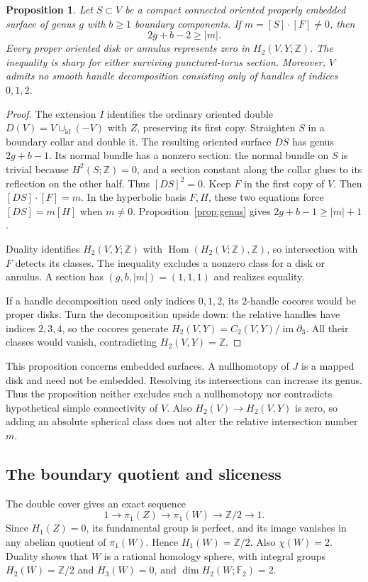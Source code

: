 \documentclass[11pt]{amsart}
\newtheorem{proposition}[theorem]{Proposition}
\theoremstyle{definition}
\theoremstyle{remark}
\newcommand{\Z}{\mathbb Z}
\newcommand{\Ftwo}{\mathbb F_2}
\begin{document}
\begin{proposition}\label{prop:relative-genus}
Let $S\subset V$ be a compact connected oriented properly embedded
surface of genus $g$ with $b\ge1$ boundary components. If
$m=[S]\cdot[F]\ne0$, then
\[
                         2g+b-2\ge |m|.
\]
Every proper oriented disk or annulus represents zero in
$H_2(V,Y;\Z)$. The inequality is sharp for either surviving
punctured-torus section. Moreover, $V$ admits no smooth handle
decomposition consisting only of handles of indices $0,1,2$.
\end{proposition}
\begin{proof}
The extension $I$ identifies the ordinary oriented double
$D(V)=V\cup_{\mathrm{id}}(-V)$ with $Z$, preserving its first copy.
Straighten $S$ in a boundary collar and double it. The resulting
oriented surface $DS$ has genus $2g+b-1$. Its normal bundle has a
nonzero section: the normal bundle on $S$ is trivial because
$H^2(S;\Z)=0$, and a section constant along the collar glues to its
reflection on the other half. Thus $[DS]^2=0$.
Keep $F$ in the first copy of $V$. Then $[DS]\cdot[F]=m$.
In the hyperbolic basis $F,H$, these two equations force
$[DS]=m[H]$ when $m\ne0$. Proposition~\ref{prop:genus} gives
$2g+b-1\ge |m|+1$.

Duality identifies $H_2(V,Y;\Z)$ with
$\operatorname{Hom}(H_2(V;\Z),\Z)$, so intersection with $F$
detects its classes. The inequality excludes a nonzero class for
a disk or annulus. A section has $(g,b,|m|)=(1,1,1)$ and realizes
equality.

If a handle decomposition used only indices $0,1,2$, its $2$-handle
cocores would be proper disks. Turn the decomposition upside down:
the relative handles have indices $2,3,4$, so the cocores generate
$H_2(V,Y)=C_2(V,Y)/\operatorname{im}\partial_3$. All their classes
would vanish, contradicting $H_2(V,Y)=\Z$.
\end{proof}

This proposition concerns embedded surfaces. A nullhomotopy of $J$
is a mapped disk and need not be embedded. Resolving its intersections
can increase its genus. Thus the proposition neither excludes such a
nullhomotopy nor contradicts hypothetical simple connectivity of $V$.
Also $H_2(V)\to H_2(V,Y)$ is zero, so adding an absolute spherical
class does not alter the relative intersection number $m$.

\subsection{The boundary quotient and sliceness}
The double cover gives an exact sequence
\[
 1\longrightarrow\pi_1(Z)\longrightarrow\pi_1(W)
                   \longrightarrow\Z/2\longrightarrow1.
\]
Since $H_1(Z)=0$, its fundamental group is perfect, and its image
vanishes in any abelian quotient of $\pi_1(W)$. Hence
$H_1(W)=\Z/2$. Also $\chi(W)=2$. Duality shows that $W$ is a
rational homology sphere, with integral groups $H_2(W)=\Z/2$ and
$H_3(W)=0$, and $\dim H_2(W;\Ftwo)=2$.
\end{document}

